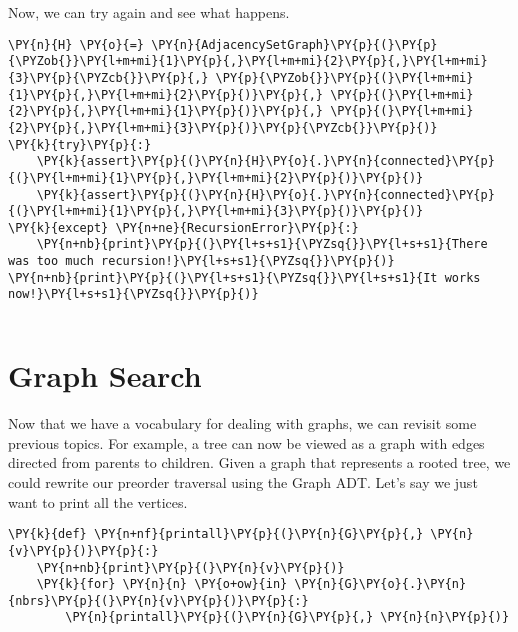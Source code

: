Now, we can try again and see what happens.


\begin{Verbatim}[commandchars=\\\{\}]
\PY{n}{H} \PY{o}{=} \PY{n}{AdjacencySetGraph}\PY{p}{(}\PY{p}{\PYZob{}}\PY{l+m+mi}{1}\PY{p}{,}\PY{l+m+mi}{2}\PY{p}{,}\PY{l+m+mi}{3}\PY{p}{\PYZcb{}}\PY{p}{,} \PY{p}{\PYZob{}}\PY{p}{(}\PY{l+m+mi}{1}\PY{p}{,}\PY{l+m+mi}{2}\PY{p}{)}\PY{p}{,} \PY{p}{(}\PY{l+m+mi}{2}\PY{p}{,}\PY{l+m+mi}{1}\PY{p}{)}\PY{p}{,} \PY{p}{(}\PY{l+m+mi}{2}\PY{p}{,}\PY{l+m+mi}{3}\PY{p}{)}\PY{p}{\PYZcb{}}\PY{p}{)}
\PY{k}{try}\PY{p}{:}
    \PY{k}{assert}\PY{p}{(}\PY{n}{H}\PY{o}{.}\PY{n}{connected}\PY{p}{(}\PY{l+m+mi}{1}\PY{p}{,}\PY{l+m+mi}{2}\PY{p}{)}\PY{p}{)}
    \PY{k}{assert}\PY{p}{(}\PY{n}{H}\PY{o}{.}\PY{n}{connected}\PY{p}{(}\PY{l+m+mi}{1}\PY{p}{,}\PY{l+m+mi}{3}\PY{p}{)}\PY{p}{)}
\PY{k}{except} \PY{n+ne}{RecursionError}\PY{p}{:}
    \PY{n+nb}{print}\PY{p}{(}\PY{l+s+s1}{\PYZsq{}}\PY{l+s+s1}{There was too much recursion!}\PY{l+s+s1}{\PYZsq{}}\PY{p}{)}
\PY{n+nb}{print}\PY{p}{(}\PY{l+s+s1}{\PYZsq{}}\PY{l+s+s1}{It works now!}\PY{l+s+s1}{\PYZsq{}}\PY{p}{)}
\end{Verbatim}

\begin{Verbatim}
\end{Verbatim}

\chapter{Graph Search}


Now that we have a vocabulary for dealing with graphs, we can revisit some previous topics.
For example, a tree can now be viewed as a graph with edges directed from parents to children.
Given a graph that represents a rooted tree, we could rewrite our preorder traversal using the Graph ADT.
Let's say we just want to print all the vertices.

\begin{Verbatim}[commandchars=\\\{\}]
\PY{k}{def} \PY{n+nf}{printall}\PY{p}{(}\PY{n}{G}\PY{p}{,} \PY{n}{v}\PY{p}{)}\PY{p}{:}
    \PY{n+nb}{print}\PY{p}{(}\PY{n}{v}\PY{p}{)}
    \PY{k}{for} \PY{n}{n} \PY{o+ow}{in} \PY{n}{G}\PY{o}{.}\PY{n}{nbrs}\PY{p}{(}\PY{n}{v}\PY{p}{)}\PY{p}{:}
        \PY{n}{printall}\PY{p}{(}\PY{n}{G}\PY{p}{,} \PY{n}{n}\PY{p}{)}
\end{Verbatim}



